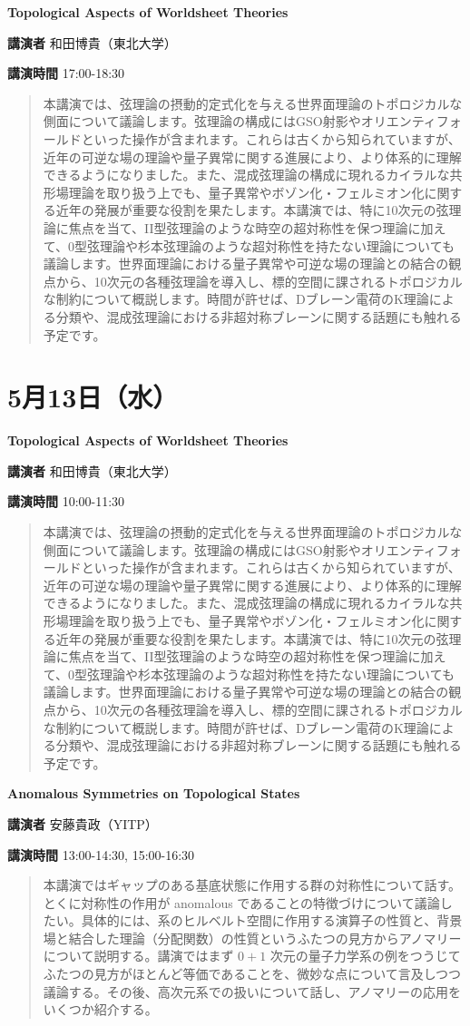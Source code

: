 \documentclass{ltjsarticle}
\theoremstyle{mystyle} %
\numberwithin{equation}{section}
\newcommand{\TBA}{TBA}
\newcommand{\spkA}{安藤貴政}
\newcommand{\spkF}{和田博貴}
\newcommand{\instA}{YITP}
\newcommand{\instF}{東北大学}
\newcommand{\titleA}{Anomalous Symmetries on Topological States}
\newcommand{\titleF}{Topological Aspects of Worldsheet Theories}
\newcommand{\abst}[5]{
    \Large
    \textbf{#1}
    \normalsize
    
    \vspace{10pt}

    \textbf{講演者} #2（#3）

    \textbf{講演時間} #4

    \vspace{5pt}

    \begin{quote}
        #5
    \end{quote}

    \vspace{10pt}
}
\begin{document}
\abst{\titleF}{\spkF}{\instF}{17:00-18:30}{
    本講演では、弦理論の摂動的定式化を与える世界面理論のトポロジカルな側面について議論します。弦理論の構成にはGSO射影やオリエンティフォールドといった操作が含まれます。これらは古くから知られていますが、近年の可逆な場の理論や量子異常に関する進展により、より体系的に理解できるようになりました。また、混成弦理論の構成に現れるカイラルな共形場理論を取り扱う上でも、量子異常やボゾン化・フェルミオン化に関する近年の発展が重要な役割を果たします。本講演では、特に10次元の弦理論に焦点を当て、II型弦理論のような時空の超対称性を保つ理論に加えて、0型弦理論や杉本弦理論のような超対称性を持たない理論についても議論します。世界面理論における量子異常や可逆な場の理論との結合の観点から、10次元の各種弦理論を導入し、標的空間に課されるトポロジカルな制約について概説します。時間が許せば、Dブレーン電荷のK理論による分類や、混成弦理論における非超対称ブレーンに関する話題にも触れる予定です。  
}


\newpage

\section*{5月13日（水）}

\abst{\titleF}{\spkF}{\instF}{10:00-11:30}{
    本講演では、弦理論の摂動的定式化を与える世界面理論のトポロジカルな側面について議論します。弦理論の構成にはGSO射影やオリエンティフォールドといった操作が含まれます。これらは古くから知られていますが、近年の可逆な場の理論や量子異常に関する進展により、より体系的に理解できるようになりました。また、混成弦理論の構成に現れるカイラルな共形場理論を取り扱う上でも、量子異常やボゾン化・フェルミオン化に関する近年の発展が重要な役割を果たします。本講演では、特に10次元の弦理論に焦点を当て、II型弦理論のような時空の超対称性を保つ理論に加えて、0型弦理論や杉本弦理論のような超対称性を持たない理論についても議論します。世界面理論における量子異常や可逆な場の理論との結合の観点から、10次元の各種弦理論を導入し、標的空間に課されるトポロジカルな制約について概説します。時間が許せば、Dブレーン電荷のK理論による分類や、混成弦理論における非超対称ブレーンに関する話題にも触れる予定です。
}

\abst{\titleA}{\spkA}{\instA}{13:00-14:30, 15:00-16:30}{
    本講演ではギャップのある基底状態に作用する群の対称性について話す。とくに対称性の作用が anomalous であることの特徴づけについて議論したい。具体的には、系のヒルベルト空間に作用する演算子の性質と、背景場と結合した理論（分配関数）の性質というふたつの見方からアノマリーについて説明する。講演ではまず $0+1$ 次元の量子力学系の例をつうじてふたつの見方がほとんど等価であることを、微妙な点について言及しつつ議論する。その後、高次元系での扱いについて話し、アノマリーの応用をいくつか紹介する。
}
\end{document}
